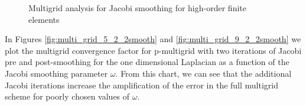 \documentclass[review]{siamart190516}
\begin{document}
\begin{figure}[!tbp]
  \centering
  \caption{Multigrid analysis for Jacobi smoothing for high-order finite elements}
\end{figure}

In Figures \ref{fig:multi_grid_5_2_2smooth} and \ref{fig:multi_grid_9_2_2smooth} we plot the multigrid convergence factor for p-multigrid with two iterations of Jacobi pre and post-smoothing for the one dimensional Laplacian as a function of the Jacobi smoothing parameter $\omega$.
From this chart, we can see that the additional Jacobi iterations increase the amplification of the error in the full multigrid scheme for poorly chosen values of $\omega$.
\end{document}
